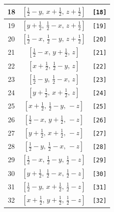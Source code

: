 \documentclass[fleqn,8pt]{jsarticle}
\begin{document}
\begin{longtable}{ccc}
18 & $\left[ \frac{1}{2} - y,\, x + \frac{1}{2},\, z + \frac{1}{2} \right]$ & {\tt [18]} \\ \hline
19 & $\left[ y + \frac{1}{2},\, \frac{1}{2} - x,\, z + \frac{1}{2} \right]$ & {\tt [19]} \\ \hline
20 & $\left[ \frac{1}{2} - x,\, \frac{1}{2} - y,\, z + \frac{1}{2} \right]$ & {\tt [20]} \\ \hline
21 & $\left[ \frac{1}{2} - x,\, y + \frac{1}{2},\, z \right]$ & {\tt [21]} \\ \hline
22 & $\left[ x + \frac{1}{2},\, \frac{1}{2} - y,\, z \right]$ & {\tt [22]} \\ \hline
23 & $\left[ \frac{1}{2} - y,\, \frac{1}{2} - x,\, z \right]$ & {\tt [23]} \\ \hline
24 & $\left[ y + \frac{1}{2},\, x + \frac{1}{2},\, z \right]$ & {\tt [24]} \\ \hline
25 & $\left[ x + \frac{1}{2},\, \frac{1}{2} - y,\, - z \right]$ & {\tt [25]} \\ \hline
26 & $\left[ \frac{1}{2} - x,\, y + \frac{1}{2},\, - z \right]$ & {\tt [26]} \\ \hline
27 & $\left[ y + \frac{1}{2},\, x + \frac{1}{2},\, - z \right]$ & {\tt [27]} \\ \hline
28 & $\left[ \frac{1}{2} - y,\, \frac{1}{2} - x,\, - z \right]$ & {\tt [28]} \\ \hline
29 & $\left[ \frac{1}{2} - x,\, \frac{1}{2} - y,\, \frac{1}{2} - z \right]$ & {\tt [29]} \\ \hline
30 & $\left[ y + \frac{1}{2},\, \frac{1}{2} - x,\, \frac{1}{2} - z \right]$ & {\tt [30]} \\ \hline
31 & $\left[ \frac{1}{2} - y,\, x + \frac{1}{2},\, \frac{1}{2} - z \right]$ & {\tt [31]} \\ \hline
32 & $\left[ x + \frac{1}{2},\, y + \frac{1}{2},\, \frac{1}{2} - z \right]$ & {\tt [32]} \\
\end{longtable}
\end{document}
